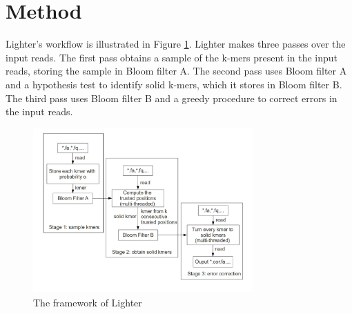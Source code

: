 \documentclass[10pt]{article}
\begin{document}

\section*{Method}
Lighter's workflow is illustrated in Figure \ref{fig:lighter_framework}. Lighter makes three passes over the input reads.  The first pass obtains a sample of the k-mers present in the input reads, storing the sample in Bloom filter A.  The second pass uses Bloom filter A and a hypothesis test to identify solid k-mers, which it stores in Bloom filter B.  The third pass uses Bloom filter B and a greedy procedure to correct errors in the input reads.

\begin{figure}[h!]
\begin{center}
\includegraphics[width=0.75\textwidth]{lighter_framework.jpg}
\caption{The framework of Lighter\label{fig:lighter_framework}}
\end{center}
\end{figure}
\end{document}
